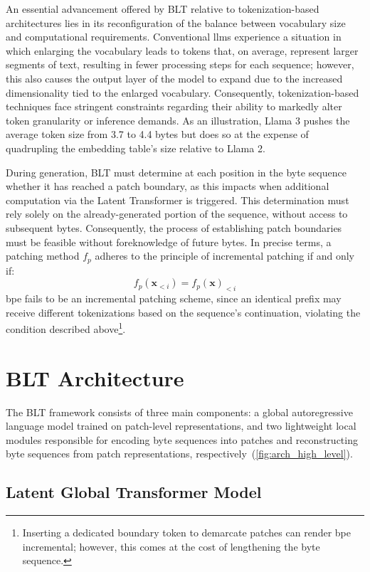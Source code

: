 An essential advancement offered by {\textsc BLT} relative to tokenization-based architectures lies in its reconfiguration of the balance between vocabulary size and computational requirements. Conventional llms experience a situation in which enlarging the vocabulary leads to tokens that, on average, represent larger segments of text, resulting in fewer processing steps for each sequence; however, this also causes the output layer of the model to expand due to the increased dimensionality tied to the enlarged vocabulary. Consequently, tokenization-based techniques face stringent constraints regarding their ability to markedly alter token granularity or inference demands. As an illustration, Llama 3 pushes the average token size from 3.7 to 4.4 bytes but does so at the expense of quadrupling the embedding table's size relative to Llama 2.

During generation, {\textsc BLT} must determine at each position in the byte sequence whether it has reached a patch boundary, as this impacts when additional computation via the Latent Transformer is triggered. This determination must rely solely on the already-generated portion of the sequence, without access to subsequent bytes. Consequently, the process of establishing patch boundaries must be feasible without foreknowledge of future bytes. In precise terms, a patching method $f_p$ adheres to the principle of incremental patching if and only if:
$$f_p(\pmb{x}_{<i}) = f_p(\pmb{x})_{<i}$$
bpe fails to be an incremental patching scheme, since an identical prefix may receive different tokenizations based on the sequence's continuation, violating the condition described above\footnote{Inserting a dedicated boundary token to demarcate patches can render bpe incremental; however, this comes at the cost of lengthening the byte sequence.}.

\section{{\textsc BLT} Architecture}
\label{section:architecture}
The {\textsc BLT} framework consists of three main components: a global autoregressive language model trained on patch-level representations, and two lightweight local modules responsible for encoding byte sequences into patches and reconstructing byte sequences from patch representations, respectively~(\autoref{fig:arch_high_level}).

\subsection{Latent Global Transformer Model}

